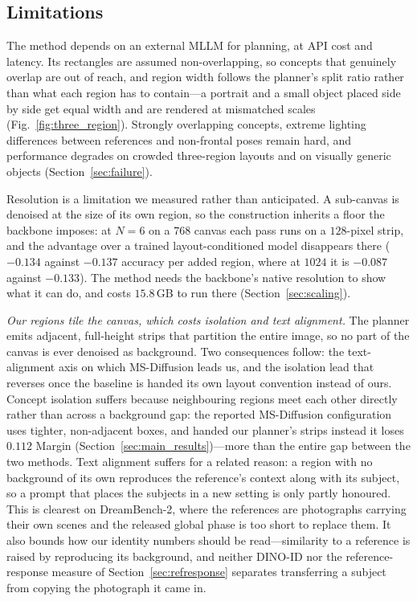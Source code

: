 \documentclass[10pt,twocolumn,letterpaper]{article}
\begin{document}

\subsection{Limitations}
\label{sec:limitations}

The method depends on an external MLLM for planning, at API cost and
latency.  Its rectangles are assumed non-overlapping, so concepts that
genuinely overlap are out of reach, and region width follows the planner's
split ratio rather than what each region has to contain---a portrait and a
small object placed side by side get equal width and are rendered at
mismatched scales (Fig.~\ref{fig:three_region}).  Strongly overlapping
concepts, extreme lighting differences between references and non-frontal
poses remain hard, and performance degrades on crowded three-region layouts
and on visually generic objects (Section~\ref{sec:failure}).

Resolution is a limitation we measured rather than anticipated.  A sub-canvas
is denoised at the size of its own region, so the construction inherits a
floor the backbone imposes: at $N{=}6$ on a $768$ canvas each pass runs on a
$128$-pixel strip, and the advantage over a trained layout-conditioned model
disappears there ($-0.134$ against $-0.137$ accuracy per added region, where
at $1024$ it is $-0.087$ against $-0.133$).  The method needs the backbone's
native resolution to show what it can do, and costs $15.8$\,GB to run there
(Section~\ref{sec:scaling}).

\noindent\textit{Our regions tile the canvas, which costs isolation and text
alignment.}
The planner emits adjacent, full-height strips that partition the entire
image, so no part of the canvas is ever denoised as background.  Two
consequences follow: the text-alignment axis on which MS-Diffusion leads us,
and the isolation lead that reverses once the baseline is handed its own
layout convention instead of ours.  Concept isolation suffers because neighbouring
regions meet each other directly rather than across a background gap: the
reported MS-Diffusion configuration uses tighter, non-adjacent boxes, and
handed our planner's strips instead it loses $0.112$ Margin
(Section~\ref{sec:main_results})---more than the entire gap between the two
methods.  Text alignment suffers for a related reason: a region with no
background of its own reproduces the reference's context along with its
subject, so a prompt that places the subjects in a new setting is only
partly honoured.  This is clearest on DreamBench-2, where the references
are photographs carrying their own scenes and the released global phase is
too short to replace them.  It also bounds how our identity numbers should
be read---similarity to a reference is raised by reproducing its
background, and neither DINO-ID nor the reference-response measure of
Section~\ref{sec:refresponse} separates transferring a subject from copying
the photograph it came in.
\end{document}
